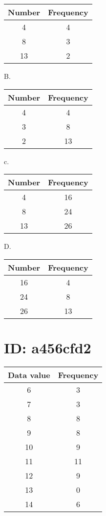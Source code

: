 \begin{center}
\begin{tabular}{|c|c|}
\hline
Number & Frequency \\
\hline
4 & 4 \\
\hline
8 & 3 \\
\hline
13 & 2 \\
\hline
\end{tabular}
\end{center}

B.

\begin{center}
\begin{tabular}{|c|c|}
\hline
Number & Frequency \\
\hline
4 & 4 \\
\hline
3 & 8 \\
\hline
2 & 13 \\
\hline
\end{tabular}
\end{center}

c.

\begin{center}
\begin{tabular}{|c|c|}
\hline
Number & Frequency \\
\hline
4 & 16 \\
\hline
8 & 24 \\
\hline
13 & 26 \\
\hline
\end{tabular}
\end{center}

D.

\begin{center}
\begin{tabular}{|c|c|}
\hline
Number & Frequency \\
\hline
16 & 4 \\
\hline
24 & 8 \\
\hline
26 & 13 \\
\hline
\end{tabular}
\end{center}

\section*{ID: a456cfd2}
\begin{center}
\begin{tabular}{|c|c|}
\hline
Data value & Frequency \\
\hline
6 & 3 \\
\hline
7 & 3 \\
\hline
8 & 8 \\
\hline
9 & 8 \\
\hline
10 & 9 \\
\hline
11 & 11 \\
\hline
12 & 9 \\
\hline
13 & 0 \\
\hline
14 & 6 \\
\hline
\end{tabular}
\end{center}

